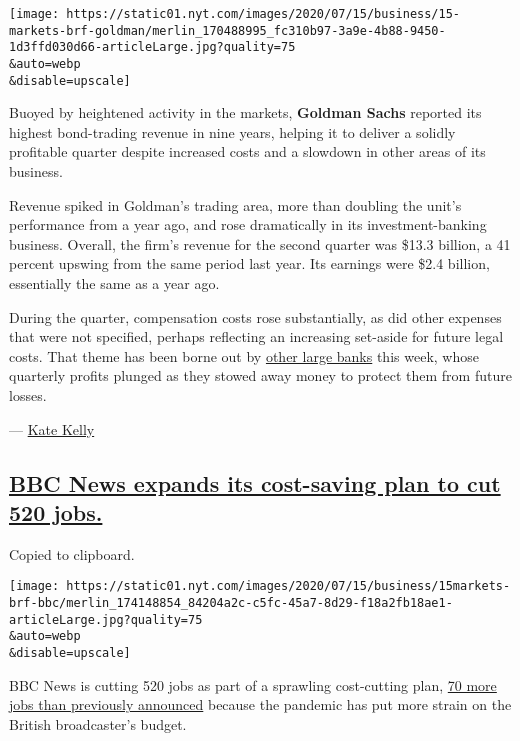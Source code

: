 \texttt{[image: https://static01.nyt.com/images/2020/07/15/business/15-markets-brf-goldman/merlin\_170488995\_fc310b97-3a9e-4b88-9450-1d3ffd030d66-articleLarge.jpg?quality=75\\\&auto=webp\\\&disable=upscale]}

Buoyed by heightened activity in the markets, \textbf{Goldman Sachs}
reported its highest bond-trading revenue in nine years, helping it to
deliver a solidly profitable quarter despite increased costs and a
slowdown in other areas of its business.

Revenue spiked in Goldman's trading area, more than doubling the unit's
performance from a year ago, and rose dramatically in its
investment-banking business. Overall, the firm's revenue for the second
quarter was \$13.3 billion, a 41 percent upswing from the same period
last year. Its earnings were \$2.4 billion, essentially the same as a
year ago.

During the quarter, compensation costs rose substantially, as did other
expenses that were not specified, perhaps reflecting an increasing
set-aside for future legal costs. That theme has been borne out by
\href{https://www.nytimes.com/2020/07/14/business/big-banks-quarterly-results.html}{other
large banks} this week, whose quarterly profits plunged as they stowed
away money to protect them from future losses.

--- \href{https://www.nytimes.com/by/kate-kelly}{Kate Kelly}

\hypertarget{bbc-news-expands-its-cost-saving-plan-to-cut-520-jobs}{%
\subsection{\texorpdfstring{\protect\hyperlink{bbc-news-expands-its-cost-saving-plan-to-cut-520-jobs}{BBC
News expands its cost-saving plan to cut 520
jobs.}}{BBC News expands its cost-saving plan to cut 520 jobs.}}\label{bbc-news-expands-its-cost-saving-plan-to-cut-520-jobs}}

Copied to clipboard.

\texttt{[image: https://static01.nyt.com/images/2020/07/15/business/15markets-brf-bbc/merlin\_174148854\_84204a2c-c5fc-45a7-8d29-f18a2fb18ae1-articleLarge.jpg?quality=75\\\&auto=webp\\\&disable=upscale]}

BBC News is cutting 520 jobs as part of a sprawling cost-cutting plan,
\href{https://www.bbc.co.uk/mediacentre/latestnews/2020/news-modernisation-update}{70
more jobs than previously announced} because the pandemic has put more
strain on the British broadcaster's budget.

